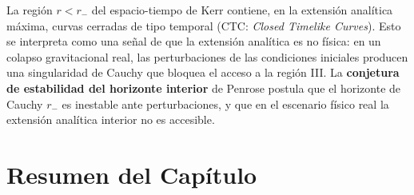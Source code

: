 \begin{importante}
La región $r < r_-$ del espacio-tiempo de Kerr contiene, en la extensión analítica máxima, curvas cerradas de tipo temporal (CTC: \textit{Closed Timelike Curves}). Esto se interpreta como una señal de que la extensión analítica es no física: en un colapso gravitacional real, las perturbaciones de las condiciones iniciales producen una singularidad de Cauchy que bloquea el acceso a la región III. La \textbf{conjetura de estabilidad del horizonte interior} de Penrose postula que el horizonte de Cauchy $r_-$ es inestable ante perturbaciones, y que en el escenario físico real la extensión analítica interior no es accesible.
\end{importante}

\section{Resumen del Capítulo}
\label{sec:resumen_cap8}

